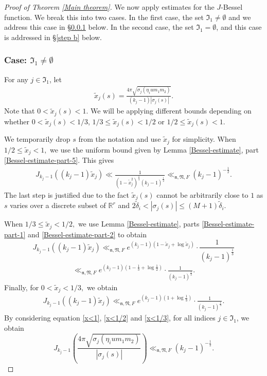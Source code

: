 \documentclass[reqno]{amsart}
\theoremstyle{plain}
\theoremstyle{definition}
\theoremstyle{remark}
\def\R{\mathbb R}
\def\R{\mathbb R}
\def\log{\operatorname{log}}
\begin{document}
\begin{proof}[Proof of Theorem \ref{Main theorem}]
We now apply estimates for the $J$-Bessel function. We break this into two cases. In the first case, the set $\mathfrak{I}_1 \not = \emptyset$ and we address this case in \S \ref{step a} below. In the second case, the set $\mathfrak{I}_1 = \emptyset$, and this case is addressed in \S \ref{step b} below.  


\subsubsection{Case: $\mathfrak{I}_1 \not = \emptyset$}\label{step a}
For any $j \in \mathfrak{I}_1$, let 
 \begin{align}\label{xalpha}
\tilde{x}_{j} (s) = \frac{4 \pi\sqrt{\sigma_{j} (\eta_i u m_1m_2 )}}{(k_{j}-1) |\sigma_{j}(s)|}.
\end{align}
Note that $0 < \tilde{x}_{j} (s) < 1$. We will be applying different bounds depending on whether $0 < \tilde{x}_{j} (s) < 1/3$, $1/3 \le  \tilde{x}_{j} (s) < 1/2$ or $1/2 \le  \tilde{x}_{j} (s) < 1$.


We temporarily drop $s$ from the notation and use $\tilde{x}_{j}$ for simplicity.  When $ 1/2 \leq \tilde{x}_{j}  <1,$ we use the uniform bound given by Lemma \ref{Bessel-estimate}, part \ref{Bessel-estimate-part-5}. This gives 
\begin{align}\label{x<1}
J_{k_{j}-1}((k_j-1) \tilde{x}_{j})\ll \frac{1}{(1-\tilde{x}_{j}^2)^{\frac{1}{4}     }  (k_{j}-1)^{\frac{1}{2}}}	\ll_{\mathfrak{n}, \mathfrak{N}, F} (k_{j}-1)^{-\frac{1}{2}}. 
\end{align}
The last step is justified due to the fact $\tilde{x}_{j} (s)$ cannot be arbitrarily close to $1$ as $s$ varies over a discrete subset of $\R^r$ and  $2\tilde{\delta}_i < |\sigma_{j}(s)| \leq (M+1)\tilde{\delta}_i.$


When $1/3 \leq  \tilde{x}_{j} < 1/2,$ we use Lemma \ref{Bessel-estimate}, parts \ref{Bessel-estimate-part-1} and \ref{Bessel-estimate-part-2} to obtain
  $$ 
  J_{k_{j}-1}((k_{j}-1) \tilde{x}_{j}) \ll_{\mathfrak{n}, \mathfrak{N}, F} e^{(k_{j}-1)(1-\tilde{x}_{j} + \log \tilde{x}_{j})}\cdot \frac{1}{(k_{j}-1)^{\frac{1}{3}}} $$
\begin{align}\label{x<1/2}
\ll_{\mathfrak{n}, \mathfrak{N}, F}  e^{(k_{j}-1)(1-\frac{1}{3} + \log \frac{1}{2})}\cdot \frac{1}{(k_{j}-1)^{\frac{1}{3}}}.
\end{align}
Finally, for $0 <  \tilde{x}_{j} <1/3,$ we obtain
\begin{align}\label{x<1/3}
J_{k_{j}-1}((k_{j}-1) \tilde{x}_{j})\ll_{\mathfrak{n}, \mathfrak{N}, F} e^{(k_{j}-1)(1 + \log \frac{1}{3})}\cdot \frac{1}{(k_{j}-1)^{\frac{1}{3}}}.
\end{align}
By considering  equation \eqref{x<1}, \eqref{x<1/2} and \eqref{x<1/3}, for all indices $j \in \mathfrak{I}_1$, we obtain   
\begin{equation}\label{x-bound}
 J_{k_{j}-1} \left(  \frac{4 \pi\sqrt{\sigma_{j} (\eta_i u m_1m_2 )}}{|\sigma_{j}(s)|}\right)
\ll_{\mathfrak{n}, \mathfrak{N}, F} (k_{j}-1)^{-\frac{1}{2}}.    
\end{equation}




\end{proof}
\end{document}
